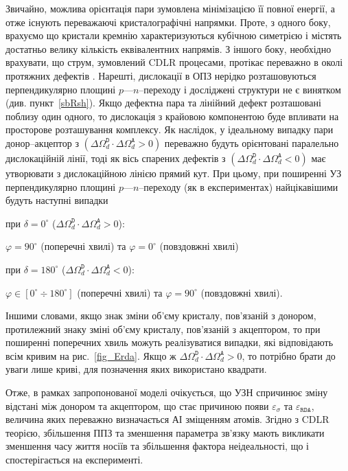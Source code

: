 Звичайно, можлива орієнтація пари зумовлена мінімізацією її повної енергії, а отже існують
переважаючі кристалографічні напрямки.
Проте, з одного боку, врахуємо що кристали кремнію характеризуються кубічною симетрією і містять достатньо велику кількість еквівалентних напрямів.
З  іншого боку, необхідно врахувати,
що струм, зумовлений CDLR процесами, протікає переважно в околі протяжних дефектів \cite{CDLR:JAP,CDLR:SSP}.
Нарешті, дислокації в ОПЗ нерідко розташовуються перпендикулярно площині $p$---$n$--переходу
і досліджені структури не є винятком (див. пункт~\ref{sbRsh}).
Якщо дефектна пара та лінійний дефект розташовані поблизу один одного, то дислокація з крайовою компонентою буде впливати на просторове розташування комплексу.
Як наслідок, у ідеальному випадку пари донор--акцептор з  $(\Delta\Omega_d^\mathtt{D}\cdot\Delta\Omega_d^\mathtt{A}>0)$ переважно будуть орієнтовані
паралельно дислокаційній лінії,
тоді як вісь спарених дефектів з $(\Delta\Omega_d^\mathtt{D}\cdot\Delta\Omega_d^\mathtt{A}<0)$ має утворювати з дислокаційною лінією прямий кут.
При цьому, при поширенні УЗ перпендикулярно площині $p$---$n$--переходу (як в експериментах)
найцікавішими будуть наступні випадки

\noindent при  $\delta=0^\circ$ ($\Delta\Omega_d^\mathtt{D}\cdot\Delta\Omega_d^\mathtt{A}>0$):

$\varphi=90^\circ$ (поперечні хвилі)  та $\varphi=0^\circ$ (повздовжні хвилі)

\noindent при  $\delta=180^\circ$ ($\Delta\Omega_d^\mathtt{D}\cdot\Delta\Omega_d^\mathtt{A}<0$):

$\varphi\in[0^\circ\div 180^\circ]$ (поперечні хвилі)  та $\varphi=90^\circ$ (повздовжні хвилі).

Іншими словами,
якщо знак зміни об'єму кристалу, пов'язаній з донором, протилежний знаку зміні об'єму кристалу, пов'язаній з акцептором, то
при поширенні поперечних хвиль можуть реалізуватися випадки, які відповідають всім кривим на рис.~\ref{fig_Erda}.
Якщо ж $\Delta\Omega_d^\mathtt{D}\cdot\Delta\Omega_d^\mathtt{A}>0$, то потрібно брати до уваги лише криві, для позначення
яких використано квадрати.


Отже, в рамках запропонованої моделі очікується, що УЗН спричинює зміну відстані між донором та акцептором,
що стає причиною появи $\varepsilon_{\sigma}$ та $\varepsilon_{\mathtt{RDA}}$, величина яких переважно визначається АІ зміщенням атомів.
Згідно з CDLR теорією,
збільшення ППЗ та зменшення параметра зв'язку мають викликати зменшення часу життя носіїв та збільшення фактора неідеальності,
що і спостерігається на експерименті.


